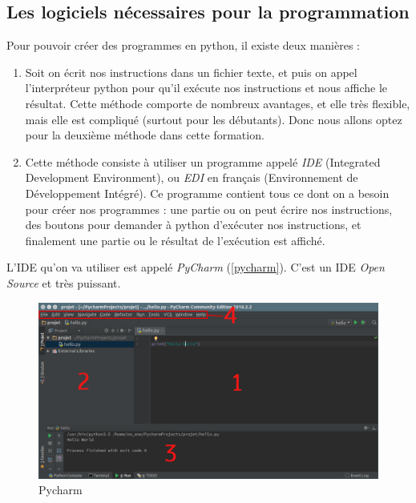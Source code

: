 \documentclass[12pt]{article}
\begin{document}
    \subsection{Les logiciels nécessaires pour la programmation}
        Pour pouvoir créer des programmes en python, il existe deux manières :
        \begin{enumerate}
            \item Soit on écrit nos instructions dans un fichier texte, et puis on appel l'interpréteur python pour
                qu'il exécute nos instructions et nous affiche le résultat. Cette méthode comporte de nombreux
                avantages, et elle très flexible, mais elle est compliqué (surtout pour les débutants). Donc nous
                allons optez pour la deuxième méthode dans cette formation.
            \item Cette méthode consiste à utiliser un programme appelé \emph{IDE} (Integrated Development Environment),
                ou \emph{EDI} en français (Environnement de Développement Intégré). Ce programme contient tous ce dont
                on a besoin pour créer nos programmes : une partie ou on peut écrire nos instructions, des boutons
                pour demander à python d'exécuter nos instructions, et finalement une partie ou le résultat de
                l'exécution est affiché.
        \end{enumerate}

        L'IDE qu'on va utiliser est appelé \emph{PyCharm} (\autoref{pycharm}). C'est un IDE \emph{Open Source} et très
        puissant.

        \begin{figure}[H]
            \centering
            \includegraphics[width=\linewidth]{img/8_pycharm.png}
            \caption{Pycharm}
            \label{pycharm}
        \end{figure}
\end{document}
